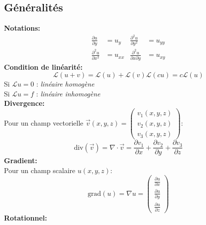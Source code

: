 \subsection*{Généralités}
\textbf{Notations:}
\begin{align*}
    \frac{\partial u}{\partial y}     & = u_y    & \frac{\partial^2 u}{\partial y^2}         & = u_{yy} \\
    \frac{\partial^2 u}{\partial x^2} & = u_{xx} & \frac{\partial^2 u}{\partial x\partial y} & = u_{xy}
\end{align*}
\textbf{Condition de linéarité:}
\begin{subequations}
    \begin{equation*}
        \mathcal{L}(u+v)=\mathcal{L}(u)+\mathcal{L}(v)
    \end{equation*}
    \begin{equation*}
        \mathcal{L}(cu)=c\mathcal{L}(u)
    \end{equation*}
\end{subequations}
Si $\mathcal{L}u=0$ : \textit{linéaire homogène} \\
Si $\mathcal{L}u=f$ : \textit{linéaire inhomogène}\\
\textbf{Divergence:}\\
Pour un champ vectorielle $\overrightarrow{v}(x,y,z)=\begin{pmatrix} v_1(x,y,z) \\ v_2(x,y,z) \\ v_3(x,y,z) \end{pmatrix}$:
\begin{equation*}
    \text{div}(\overrightarrow{v})=\nabla\cdot\overrightarrow{v}=\frac{\partial v_1}{\partial x}+\frac{\partial v_2}{\partial y}+\frac{\partial v_3}{\partial z}
\end{equation*}
\textbf{Gradient:}\\
Pour un champ scalaire $u(x,y,z)$:
\begin{equation*}
    \text{grad}(u)=\nabla u=\begin{pmatrix} \frac{\partial u}{\partial x} \\ \frac{\partial u}{\partial y} \\ \frac{\partial u}{\partial z} \end{pmatrix}
\end{equation*}
\textbf{Rotationnel:}\\
